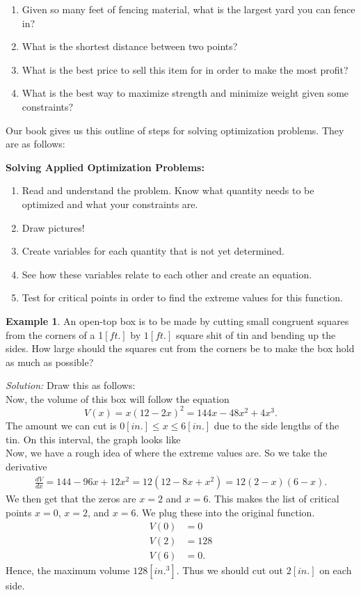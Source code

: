\documentclass[leqno]{article}
\theoremstyle{definition}
\newtheorem{example}{Example}[section]
\theoremstyle{remark}
\theoremstyle{theorem}
\begin{document}
\begin{enumerate}[1.]
\item Given so many feet of fencing material, what is the largest yard you can fence in?
\item What is the shortest distance between two points?
\item What is the best price to sell this item for in order to make the most profit?
\item What is the best way to maximize strength and minimize weight given some constraints?
\end{enumerate}

Our book gives us this outline of steps for solving optimization problems.  They are as follows:

\noindent \textbf{Solving Applied Optimization Problems:}
\begin{enumerate}[1.]
\item Read and understand the problem. Know what quantity needs to be optimized and what your constraints are.
\item Draw pictures!
\item Create variables for each quantity that is not yet determined.  
\item See how these variables relate to each other and create an equation.
\item Test for critical points in order to find the extreme values for this function.
\end{enumerate}

\begin{example}
An open-top box is to be made by cutting small congruent squares from the corners of a 1$[ft.]$ by $1[ft.]$ square shit of tin and bending up the sides. How large should the squares cut from the corners be to make the box hold as much as possible?

\noindent \emph{Solution:} Draw this as follows:
\vspace*{5cm}\\
Now, the volume of this box will follow the equation
\[
V(x)=x(12-2x)^2=144x-48x^2+4x^3.
\]
The amount we can cut is $0[in.]\leq x\leq 6[in.]$ due to the side lengths of the tin. On this interval, the graph looks like
\vspace*{5cm}\\
Now, we have a rough idea of where the extreme values are. So we take the derivative
\begin{align*}
\frac{dV}{dx}=144-96x+12x^2=12(12-8x+x^2)=12(2-x)(6-x).
\end{align*}
We then get that the zeros are $x=2$ and $x=6$.  This makes the list of critical points $x=0$, $x=2$, and $x=6$. We plug these into the original function.
\begin{align*}
V(0)&=0\\
V(2)&=128\\
V(6)&=0.
\end{align*}
Hence, the maximum volume $128[in.^3]$. Thus we should cut out $2[in.]$ on each side.
\end{example}
\end{document}
